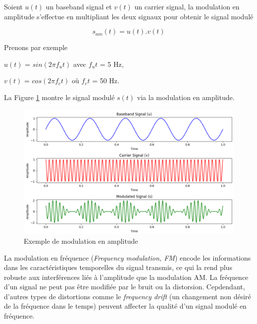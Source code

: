 \vspace{0.1cm}

Soient $u(t)$ un baseband signal et $v(t)$ un carrier signal, la modulation en amplitude s'effectue en multipliant les deux signaux pour obtenir le signal modulé 

\begin{equation}\label{eq2}
s_{am}(t) = u(t) . v(t)
\end{equation}

Prenons par exemple 

$u(t)$ = $sin(2\pi f_{u}t)$ avec $f_{u}t$ = 5 Hz,

$v(t)$ = $cos(2\pi f_{c}t)$ où $f_{c}t$ = 50 Hz.

La Figure \ref{term1} montre le signal modulé $s(t)$ via la modulation en amplitude.

\newpage

\begin{figure}[h]
\centering

\includegraphics[scale=0.5]{images/AM_mod.PNG}
\caption{Exemple de modulation en amplitude}\label{term1}
\end{figure}


La modulation en fréquence (\textit{Frequency modulation, FM}) encode les informations dans les caractéristiques temporelles du signal transmis, ce qui la rend plus robuste aux interférences liés à l'amplitude que la modulation AM. La fréquence d'un signal ne peut pas être modifiée par le bruit ou la distorsion. Cepdendant, d'autres types de distortions comme le \textit{frequency drift} (un changement non désiré de la fréquence dans le temps) peuvent affecter la qualité d'un signal modulé en fréquence.

\vspace{0.1cm}

